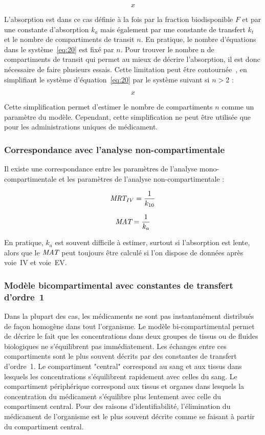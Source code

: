 \begin{equation}
x
\label{eq:20}
\end{equation}

L'absorption est dans ce cas définie à la fois par la fraction biodisponible $F$ et par une constante d'absorption $k_{a}$ mais également par une constante de transfert $k_t$ et le nombre de compartiments de transit $n$. En pratique, le nombre d'équations dans le système~\ref{eq:20} est fixé par $n$. Pour trouver le nombre n de compartiments de transit qui permet au mieux de décrire l'absorption, il est donc nécessaire de faire plusieurs essais. Cette limitation peut être contournée~\citep{REF1}, en simplifiant le système d'équation~\ref{eq:20} par le système suivant si $n > 2$ :

\begin{equation}
x
\label{eq:21}
\end{equation}

Cette simplification permet d'estimer le nombre de compartiments $n$ comme un paramètre du modèle. Cependant, cette simplification ne peut être utilisée que pour les administrations uniques de médicament.

\subsubsection{Correspondance avec l'analyse non-compartimentale}
Il existe une correspondance entre les paramètres de l'analyse mono-compartimentale et les paramètres de l'analyse non-compartimentale :

\begin{equation}
\operatorname{\textit{MRT}}_{IV} = \frac{1}{k_{10}}
\label{eq:22}
\end{equation}


\begin{equation}
\operatorname{\textit{MAT}} = \frac{1}{k_a}
\label{eq:23}
\end{equation}

En pratique, $k_a$ est souvent difficile à estimer, surtout si l'absorption est lente, alors que le $\operatorname{\textit{MAT}}$ peut toujours être calculé si l'on dispose de données après voie~IV et voie~EV.

\subsubsection{Modèle bicompartimental avec constantes de transfert d'ordre~1}
Dans la plupart des cas, les médicaments ne sont pas instantanément distribués de façon homogène dans tout l'organisme. Le modèle bi-compartimental permet de décrire le fait que les concentrations dans deux groupes de tissus ou de fluides biologiques ne s'équilibrent pas immédiatement. Les échanges entre ces compartiments sont le plus souvent décrits par des constantes de transfert d'ordre~1. Le compartiment "central" correspond au sang et aux tissus dans lesquels les concentrations s'équilibrent rapidement avec celles du sang. Le compartiment périphérique correspond aux tissus et organes dans lesquels la concentration du médicament s'équilibre plus lentement avec celle du compartiment central. Pour des raisons d'identifiabilité, l'élimination du médicament de l'organisme est le plus souvent décrite comme se faisant à partir du compartiment central.

